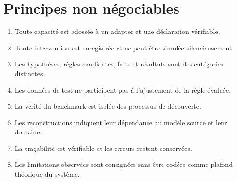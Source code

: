 \documentclass[11pt,a4paper]{article}
\begin{document}
\section{Principes non négociables}
\begin{enumerate}
\item Toute capacité est adossée à un adapter et une déclaration vérifiable.
\item Toute intervention est enregistrée et ne peut être simulée silencieusement.
\item Les hypothèses, règles candidates, faits et résultats sont des catégories distinctes.
\item Les données de test ne participent pas à l'ajustement de la règle évaluée.
\item La vérité du benchmark est isolée des processus de découverte.
\item Les reconstructions indiquent leur dépendance au modèle source et leur domaine.
\item La traçabilité est vérifiable et les erreurs restent conservées.
\item Les limitations observées sont consignées sans être codées comme plafond théorique du système.
\end{enumerate}
\end{document}

